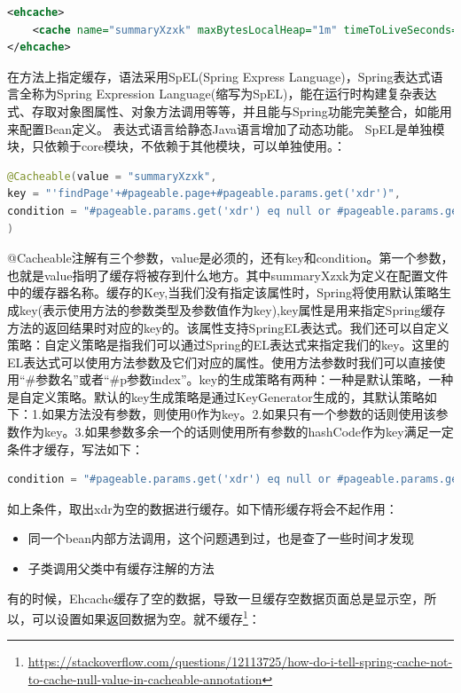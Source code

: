 \documentclass[12pt]{book}
\numberwithin{dummy}{section}
\theoremstyle{ocrenumbox}
\theoremstyle{blacknumex}
\theoremstyle{blacknumbox}
\theoremstyle{ocrenum}
\begin{document}
\begin{lstlisting}[language=XML]
<ehcache>
	<cache name="summaryXzxk" maxBytesLocalHeap="1m" timeToLiveSeconds="200"/>
</ehcache>
\end{lstlisting}

在方法上指定缓存，语法采用SpEL(Spring Express Language)，Spring表达式语言全称为Spring Expression Language(缩写为SpEL)，能在运行时构建复杂表达式、存取对象图属性、对象方法调用等等，并且能与Spring功能完美整合，如能用来配置Bean定义。 表达式语言给静态Java语言增加了动态功能。
SpEL是单独模块，只依赖于core模块，不依赖于其他模块，可以单独使用。：

\begin{lstlisting}[language=Java]
@Cacheable(value = "summaryXzxk",
key = "'findPage'+#pageable.page+#pageable.params.get('xdr')",
condition = "#pageable.params.get('xdr') eq null or #pageable.params.get('xdr') eq ''"
)
\end{lstlisting}

@Cacheable注解有三个参数，value是必须的，还有key和condition。第一个参数，也就是value指明了缓存将被存到什么地方。其中summaryXzxk为定义在配置文件中的缓存器名称。缓存的Key,当我们没有指定该属性时，Spring将使用默认策略生成key(表示使用方法的参数类型及参数值作为key),key属性是用来指定Spring缓存方法的返回结果时对应的key的。该属性支持SpringEL表达式。我们还可以自定义策略：自定义策略是指我们可以通过Spring的EL表达式来指定我们的key。这里的EL表达式可以使用方法参数及它们对应的属性。使用方法参数时我们可以直接使用“\#参数名”或者“\#p参数index”。key的生成策略有两种：一种是默认策略，一种是自定义策略。默认的key生成策略是通过KeyGenerator生成的，其默认策略如下：1.如果方法没有参数，则使用0作为key。2.如果只有一个参数的话则使用该参数作为key。3.如果参数多余一个的话则使用所有参数的hashCode作为key满足一定条件才缓存，写法如下：

\begin{lstlisting}[language=Java]
condition = "#pageable.params.get('xdr') eq null or #pageable.params.get('xdr') eq ''"
\end{lstlisting}

如上条件，取出xdr为空的数据进行缓存。如下情形缓存将会不起作用：

\begin{itemize}
	\item{同一个bean内部方法调用，这个问题遇到过，也是查了一些时间才发现}
	\item{子类调用父类中有缓存注解的方法}
\end{itemize}

有的时候，Ehcache缓存了空的数据，导致一旦缓存空数据页面总是显示空，所以，可以设置如果返回数据为空。就不缓存\footnote{\url{https://stackoverflow.com/questions/12113725/how-do-i-tell-spring-cache-not-to-cache-null-value-in-cacheable-annotation}}：
\end{document}
